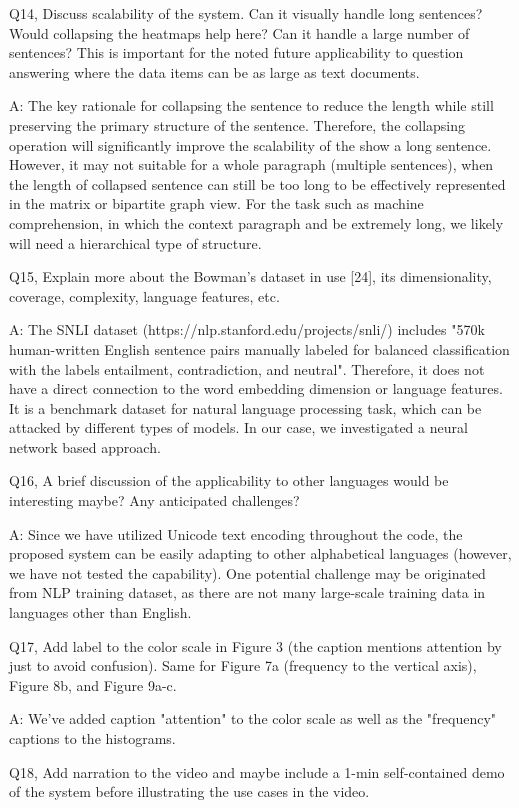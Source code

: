 Q14, Discuss scalability of the system. Can it visually handle long sentences? Would collapsing the heatmaps help here? Can it handle a large number of sentences? This is important for the noted future applicability to question answering where the data items can be as large as text documents.

A: The key rationale for collapsing the sentence to reduce the length while still preserving the primary structure of the sentence. Therefore, the collapsing operation will significantly improve the scalability of the show a long sentence. However, it may not suitable for a whole paragraph (multiple sentences), when the length of collapsed sentence can still be too long to be effectively represented in the matrix or bipartite graph view. For the task such as machine comprehension, in which the context paragraph and be extremely long, we likely will need a hierarchical type of structure.

Q15, Explain more about the Bowman's dataset in use [24], its dimensionality, coverage, complexity, language features, etc.

A: The SNLI dataset (https://nlp.stanford.edu/projects/snli/) includes "570k human-written English sentence pairs manually labeled for balanced classification with the labels entailment, contradiction, and neutral". Therefore, it does not have a direct connection to the word embedding dimension or language features. It is a benchmark dataset for natural language processing task, which can be attacked by different types of models. In our case, we investigated a neural network based approach.

Q16, A brief discussion of the applicability to other languages would be interesting maybe? Any anticipated challenges?

A: Since we have utilized Unicode text encoding throughout the code, the proposed system can be easily adapting to other alphabetical languages (however, we have not tested the capability). One potential challenge may be originated from NLP training dataset, as there are not many large-scale training data in languages other than English.

Q17, Add label to the color scale in Figure 3 (the caption mentions attention by just to avoid confusion). Same for Figure 7a (frequency to the vertical axis), Figure 8b, and Figure 9a-c.

A: We've added caption "attention" to the color scale as well as the "frequency" captions to the histograms.

Q18, Add narration to the video and maybe include a 1-min self-contained demo of the system before illustrating the use cases in the video.

